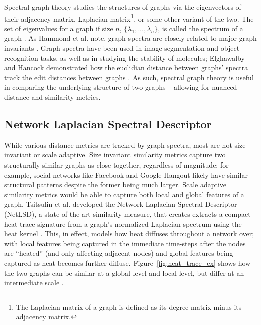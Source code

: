 Spectral graph theory studies the structures of graphs via the eigenvectors of
their adjacency matrix, Laplacian matrix\footnote{The Laplacian matrix of a
graph is defined as its degree matrix minus its adjacency matrix.}, or some
other variant of the two. The set of eigenvalues for a graph if size $n$,
$\{\lambda_{1},...,\lambda_{n}\}$, is called the spectrum of a graph
\cite{netlsd}. As Hammond et al. note, graph spectra are closely related to
major graph invariants \cite{chung1997spectral}. Graph spectra have been used in
image segmentation and object recognition tasks, as well as in studying the
stability of molecules; Elghawalby and Hancock demonstrated how the euclidian
distance between graphs' spectra track the edit distances between graphs
\cite{elghawalby2008measuring,chung1997spectral}. As such, spectral graph theory
is useful in comparing the underlying structure of two graphs -- allowing for
nuanced distance and similarity metrics.   

\subsection{Network Laplacian Spectral Descriptor}\label{sec:NetLSD}

While various distance metrics are tracked by graph spectra, most are not size
invariant or scale adaptive. Size invariant similarity metrics capture two
structurally similar graphs as close together, regardless of magnitude; for
example, social networks like Facebook and Google Hangout likely have similar
structural patterns despite the former being much larger. Scale adaptive
similarity metrics would be able to capture both local and global features of a
graph. Tsitsulin et al. developed the Network Laplacian Spectral Descriptor
(NetLSD), a state of the art similarity measure, that creates extracts a compact
heat trace signature from a graph's normalized Laplacian spectrum using the heat
kernel \cite{netlsd}. This, in effect, models how heat diffuses throughout a
network over; with local features being captured in the immediate time-steps
after the nodes are ``heated'' (and only affecting adjacent nodes) and global
features being captured as heat becomes further diffuse.
Figure~\ref{fig:heat_trace_ex} shows how the two graphs can be similar at a
global level and local level, but differ at an intermediate scale \cite{netlsd}.

